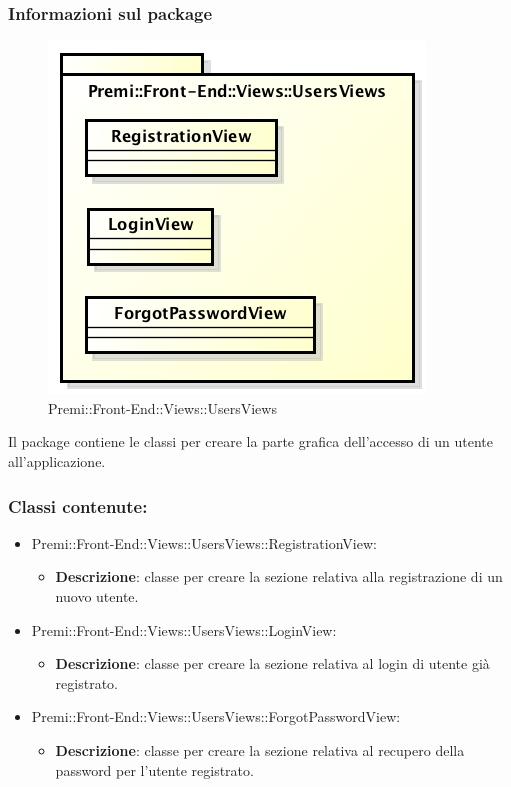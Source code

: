 	\subsubsection*{Informazioni sul package}
	\begin{figure}[h]
		\centering
		\includegraphics[width=0.7\linewidth]{img/front-end_views_usersviews}
		\caption[Premi::Front-End::Views::UsersViews]{Premi::Front-End::Views::UsersViews}
	\end{figure}
	Il package contiene le classi per creare la parte grafica dell'accesso di un utente all'applicazione.

	\subsubsection*{Classi contenute:}
	\begin{itemize}

		\item Premi::Front-End::Views::UsersViews::RegistrationView:
		\begin{itemize}
			\item \textbf{Descrizione}: classe per creare la sezione relativa alla registrazione di un nuovo utente.
		\end{itemize}

		\item Premi::Front-End::Views::UsersViews::LoginView:
		\begin{itemize}
			\item \textbf{Descrizione}: classe per creare la sezione relativa al login di utente già registrato.
		\end{itemize}

		\item Premi::Front-End::Views::UsersViews::ForgotPasswordView:
		\begin{itemize}
			\item \textbf{Descrizione}: classe per creare la sezione relativa al recupero della password per l'utente registrato.
		\end{itemize}
	\end{itemize}



